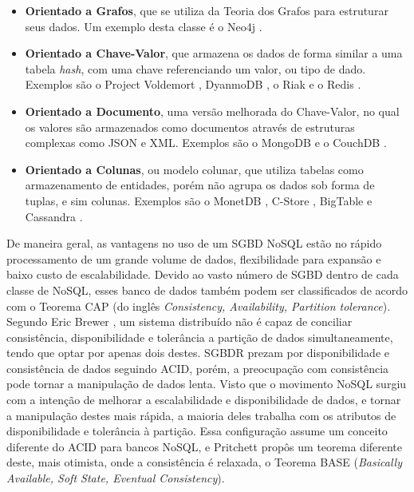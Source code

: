 \begin{itemize}
    \item{\textbf{Orientado a Grafos}}, que se utiliza da Teoria dos Grafos para estruturar seus dados. 
    Um exemplo desta classe é o Neo4j \cite{neo2018nosql}.
    \item{\textbf{Orientado a Chave-Valor}}, que armazena os dados de forma similar a uma tabela \textit{hash}, 
    com uma chave referenciando um valor, ou tipo de dado. Exemplos são o Project Voldemort \cite{voldemort2018nosql}, 
    DyanmoDB \cite{amazon2018nosql}, o Riak \cite{riak2018nosql} e o Redis \cite{redis2018nosql}.
    \item{\textbf{Orientado a Documento}}, uma versão melhorada do Chave-Valor, 
    no qual os valores são armazenados como documentos através de estruturas complexas como JSON e XML. 
    Exemplos são o MongoDB \cite{mongo2018nosql} e o CouchDB \cite{couch2018nosql}.
    \item{\textbf{Orientado a Colunas}}, ou modelo colunar, 
    que utiliza tabelas como armazenamento de entidades, 
    porém não agrupa os dados sob forma de tuplas, e sim colunas. Exemplos são o MonetDB \cite{monetdb2017c}, C-Store \cite{cstore2018nosql}, BigTable \cite{google2018nosql} e Cassandra \cite{cassandra2018nosql}.
\end{itemize}

De maneira geral, as vantagens no uso de um SGBD NoSQL estão no rápido processamento de um grande volume de dados, flexibilidade para expansão e baixo custo de escalabilidade. Devido ao vasto número de SGBD dentro de cada classe de NoSQL, esses banco de dados também podem ser classificados de acordo com o Teorema CAP (do inglês \textit{Consistency, Availability, Partition tolerance}). Segundo Eric Brewer \cite{brewer2000towards, gilbert2002brewer}, um sistema distribuído não é 
capaz de conciliar consistência, disponibilidade e tolerância a partição de dados simultaneamente, tendo que optar por apenas dois destes. 
SGBDR prezam por disponibilidade e consistência de dados seguindo ACID, porém, a preocupação com consistência 
pode tornar a manipulação de dados lenta. Visto que o movimento NoSQL surgiu com a intenção de 
melhorar a escalabilidade e disponibilidade de dados, e tornar a manipulação destes mais rápida, 
a maioria deles trabalha com os atributos de disponibilidade e tolerância à partição. 
Essa configuração assume um conceito diferente do ACID para bancos NoSQL, e Pritchett \cite{pritchett2008base} propôs um teorema diferente deste, mais otimista, onde a consistência é relaxada, o Teorema BASE (\textit{Basically Available, Soft State, Eventual Consistency}).

